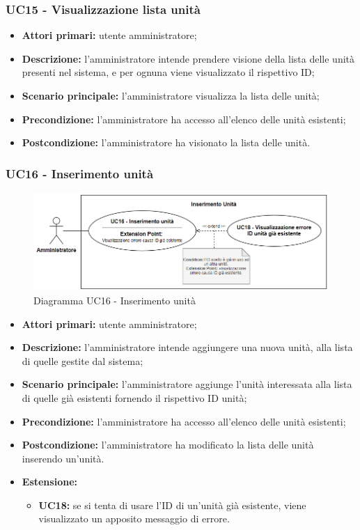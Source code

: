 \subsubsection{UC15 - Visualizzazione lista unità}
\begin{itemize}
	\item \textbf{Attori primari:} utente amministratore;
	\item \textbf{Descrizione:} l'amministratore intende prendere visione della lista delle unità presenti nel sistema, e per ognuna viene visualizzato il rispettivo ID;
	\item \textbf{Scenario principale:} l'amministratore visualizza la lista delle unità;
	\item \textbf{Precondizione:} l'amministratore ha accesso all'elenco delle unità esistenti;
	\item \textbf{Postcondizione:} l'amministratore ha visionato la lista delle unità.
\end{itemize}

\subsubsection{UC16 - Inserimento unità}
	\begin{figure}[H]
		\centering
		\includegraphics[width=15cm]{images/uc16.png}
		\caption{Diagramma UC16 - Inserimento unità}
	\end{figure}
	\begin{itemize}
		\item \textbf{Attori primari:} utente amministratore;
		\item \textbf{Descrizione:} l'amministratore intende aggiungere una nuova unità, alla lista di quelle gestite dal sistema;
		\item \textbf{Scenario principale:} l'amministratore aggiunge l'unità interessata alla lista di quelle già esistenti fornendo il rispettivo ID unità;
		\item \textbf{Precondizione:} l'amministratore ha accesso all'elenco delle unità esistenti;
		\item \textbf{Postcondizione:} l'amministratore ha modificato la lista delle unità inserendo un'unità.
		\item \textbf{Estensione:}
		\begin{itemize}
			\item \textbf{UC18:} se si tenta di usare l'ID di un'unità già esistente, viene visualizzato un apposito messaggio di errore.
		\end{itemize}
	\end{itemize}

